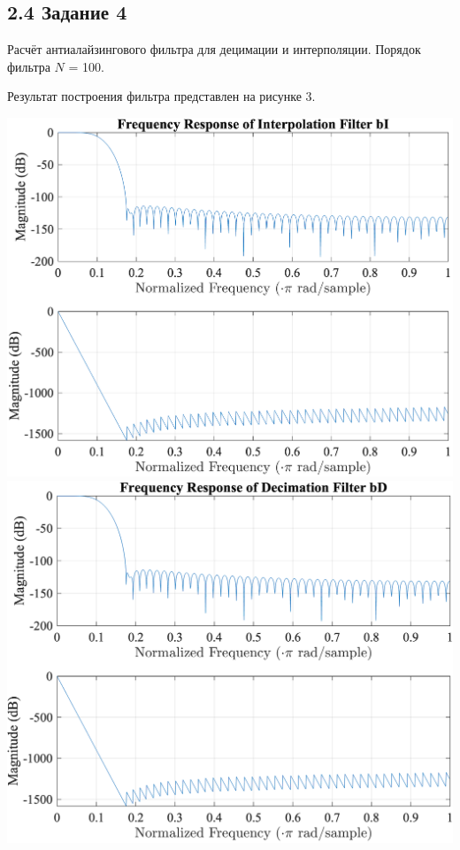 \documentclass[a4paper,14pt]{extarticle}
\begin{document}
\subsection*{2.4 Задание 4}
Расчёт антиалайзингового фильтра для децимации и интерполяции.
Порядок фильтра $N$ = 100.



  Результат построения фильтра представлен 
на рисунке 3.
\begin{center}
  \includegraphics{img/Task_4_1.png}
  \includegraphics{img/Task_4_2.png}
\end{center}
\end{document}
